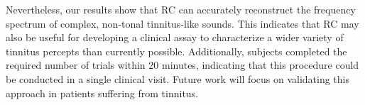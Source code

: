 \documentclass[journal]{IEEEtran}
\begin{document}
Nevertheless, our results show that RC can accurately reconstruct the frequency spectrum of complex, non-tonal tinnitus-like sounds.
This indicates that RC may also be useful for developing a clinical assay to characterize a wider variety of tinnitus percepts than currently possible.
Additionally, subjects completed the required number of trials within 20 minutes,
indicating that this procedure could be conducted in a single clinical visit.
Future work will focus on validating this approach in patients suffering from tinnitus.




\end{document}
